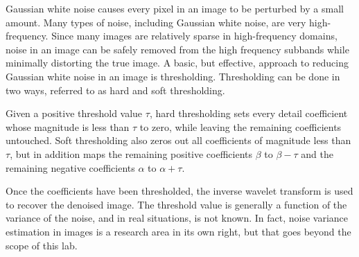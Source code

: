 
Gaussian white noise causes every pixel in an image to be perturbed by a small amount. %
Many types of noise, including Gaussian white noise, are very high-frequency.
Since many images are relatively sparse in high-frequency domains, noise in an image can be safely removed from the high frequency subbands while minimally distorting the true image.
A basic, but effective, approach to reducing Gaussian white noise in an image is thresholding.
Thresholding can be done in two ways, referred to as hard and soft thresholding.

Given a positive threshold value $\tau$, hard thresholding sets every detail coefficient whose magnitude is less than $\tau$ to zero, while leaving the remaining coefficients untouched.
Soft thresholding also zeros out all coefficients of magnitude less than $\tau$, but in addition maps the remaining positive coefficients $\beta$ to $\beta - \tau$ and the remaining negative coefficients
$\alpha$ to $\alpha + \tau$.

\begin{comment}
Implementing these simple thresholding algorithms in Python is straight-forward, but PyWavelets already provides this functionality.
The following code gives an example.

\begin{lstlisting}
>>> A = np.arange(-4,5).reshape(3,3)
>>> A
array([[-4, -3, -2],
       [-1,  0,  1],
       [ 2,  3,  4]])
>>> pywt.thresholding.hard(A,1.5)
array([[-4, -3, -2],
       [ 0,  0,  0],
       [ 2,  3,  4]])
>>> pywt.thresholding.soft(A,1.5)
array([[-2.5, -1.5, -0.5],
       [ 0. ,  0. ,  0. ],
       [ 0.5,  1.5,  2.5]])
\end{lstlisting}
\end{comment}

Once the coefficients have been thresholded, the inverse wavelet transform is used to recover the denoised image.
The threshold value is generally a function of the variance of the noise, and in real situations, is not known.
In fact, noise variance estimation in images is a research area in its own right, but that goes beyond the scope of this lab.

